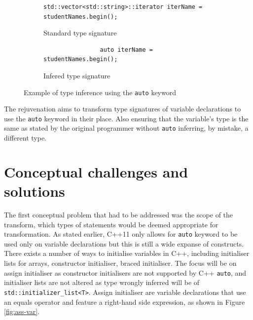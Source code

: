 \documentclass[bsc,frontabs,singlespacing,parskip,deptreport]{infthesis}
\begin{document}
\begin{figure}[!h]
    \centering
    \begin{subfigure}[h]{\textwidth}
        \centering
        \begin{verbatim}
std::vector<std::string>::iterator iterName = studentNames.begin();
        \end{verbatim}
        \caption{Standard type signature}
        \label{fig:auto-type-before}
    \end{subfigure}
    
    \begin{subfigure}[h]{\textwidth}
        \centering
        \begin{verbatim}
                auto iterName = studentNames.begin(); 
        \end{verbatim}
        \caption{Infered type signature}
        \label{fig:auto-type-after}
    \end{subfigure}
    \caption{Example of type inference using the \texttt{auto} keyword}
    \label{fig:auto-type}
\end{figure}

The rejuvenation aims to transform type signatures of variable declarations to use the \texttt{auto} keyword in their place. Also ensuring that the variable's type is the same as stated by the original programmer without \texttt{auto} inferring, by mistake, a different type.


\section{Conceptual challenges and solutions}
The first conceptual problem that had to be addressed was the scope of the transform, which types of statements would be deemed appropriate for transformation. As stated earlier, C++11 only allows for \texttt{auto} keyword to be used only on variable declarations but this is still a wide expanse of constructs. There exists a number of ways to initialise variables in C++, including initialiser lists for arrays, constructor initialiser, braced initialiser. The focus will be on assign initialiser as constructor initialisers are not supported by C++ \texttt{auto}, and initialiser lists are not altered as type wrongly inferred will be of \texttt{std::initializer\_list<T>}. Assign initialiser are variable declarations that use an equals operator and feature a right-hand side expression, as shown in Figure \ref{fig:ass-var}.
\end{document}
